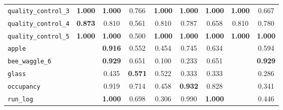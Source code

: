 \begin{tabular}{lcccccccc}
\verb+quality_control_3+ & \textbf{1.000} & \textbf{1.000} & 0.766 & \textbf{1.000} & \textbf{1.000} & \textbf{1.000} & \textbf{1.000} & 0.667\\
\verb+quality_control_4+ & \textbf{0.873} & 0.810 & 0.561 & 0.810 & 0.787 & 0.658 & 0.810 & 0.780\\
\verb+quality_control_5+ & \textbf{1.000} & \textbf{1.000} & 0.500 & \textbf{1.000} & \textbf{1.000} & \textbf{1.000} & \textbf{1.000} & \textbf{1.000}\\
\midrule
\verb+apple+ &  & \textbf{0.916} & 0.552 & 0.454 & 0.745 & 0.634 &  & 0.594\\
\verb+bee_waggle_6+ &  & \textbf{0.929} & 0.651 & 0.100 & 0.233 & 0.651 &  & \textbf{0.929}\\
\verb+glass+ &  & 0.435 & \textbf{0.571} & 0.522 & 0.333 & 0.333 &  & 0.286\\
\verb+occupancy+ &  & 0.919 & 0.714 & 0.458 & \textbf{0.932} & 0.828 &  & 0.341\\
\verb+run_log+ &  & \textbf{1.000} & 0.698 & 0.306 & 0.990 & \textbf{1.000} &  & 0.446\\
\bottomrule
\end{tabular}
